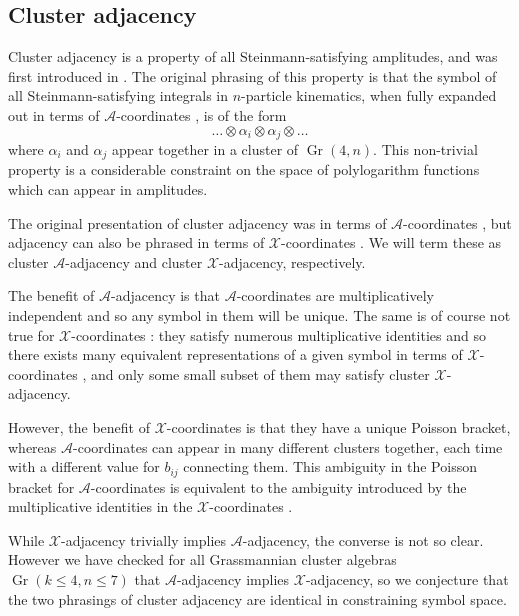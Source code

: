 \documentclass[11pt]{article}
\DeclareMathOperator{\Gr}{Gr}
\def\x{\mathcal{X}}
\def\xcoords{$\mathcal{X}$-coordinates }
\def\a{\mathcal{A}}
\def\acoords{$\mathcal{A}$-coordinates }
\def\flag{{\huge \color{red} \textinterrobang}}
\begin{document}
\subsection{Cluster adjacency}
Cluster adjacency is a property of all Steinmann-satisfying amplitudes, and was first introduced in \cite{Drummond:2017ssj}. The original phrasing of this property is that the symbol of all Steinmann-satisfying integrals in $n$-particle kinematics, when fully expanded out in terms of \acoords, is of the form 
\begin{equation}
	\ldots \otimes \alpha_i \otimes \alpha_j\otimes \ldots 
\end{equation}
where $\alpha_i$ and $\alpha_j$ appear together in a cluster of $\Gr(4,n)$. This non-trivial property is a considerable constraint on the space of polylogarithm functions which can appear in amplitudes. 

The original presentation of cluster adjacency was in terms of \acoords, but adjacency can also be phrased in terms of \xcoords. We will term these as cluster $\a$-adjacency and cluster $\x$-adjacency, respectively. 

The benefit of $\a$-adjacency is that \acoords are multiplicatively independent and so any symbol in them will be unique. The same is of course not true for \xcoords: they satisfy numerous multiplicative identities and so there exists many equivalent representations of a given symbol in terms of \xcoords, and only some small subset of them may satisfy cluster $\x$- adjacency. 

However, the benefit of \xcoords is that they have a unique Poisson bracket, whereas \acoords can appear in many different clusters together, each time with a different value for $b_{ij}$ connecting them. This ambiguity in the Poisson bracket for \acoords is equivalent to the ambiguity introduced by the multiplicative identities in the \xcoords.  

While $\x$-adjacency trivially implies $\a$-adjacency, the converse is not so clear. However we have checked for all Grassmannian cluster algebras $\Gr(k\le4,n\le7)$ that $\a$-adjacency implies $\x$-adjacency, so we conjecture that the two phrasings of cluster adjacency are identical in constraining symbol space. \flag
\end{document}
